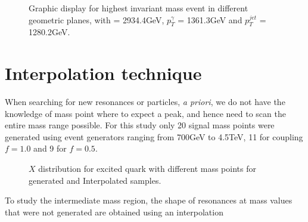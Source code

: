 \begin{figure}[h!]
 \caption{Graphic display for highest \gamjet invariant mass event in different geometric planes, with \mgamjet = 2934.4\unit{GeV}, $p^{\gamma}_{T}$ = 1361.3\unit{GeV} and $p^{jet}_{T}$ = 1280.2\unit{GeV}.}
\label{fig:EventDisplay}
\end{figure}

\section{Interpolation technique}\label{Se:InterpolationTech}
When searching for new resonances or particles, \emph{a priori}, we do not have the knowledge of mass point where to expect a peak, and hence need 
to scan the entire mass range possible. For this study only 20 \qstar signal mass points were generated using event generators ranging from 700\unit{GeV} to 4.5\unit{TeV}, 11 for coupling $f = 1.0$ and 9 for $f=0.5$. 
\begin{figure}[h!]
\centering
 \caption{$X$ distribution for excited quark with different mass points for generated and Interpolated samples.}
 \label{fig:XDist}
\end{figure}
To study the intermediate mass region, the shape of resonances at mass values that were not generated are obtained using an interpolation 
